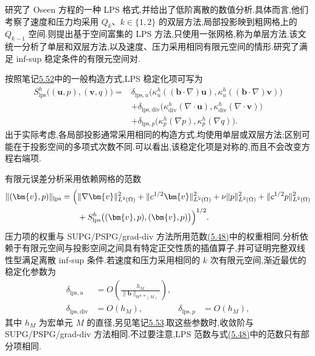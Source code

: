 \begin{note}[LPS 格式]\label{note:oseen-lps-schemes}
\textcite{BraackBurman2006}研究了 Oseen 方程的一种 LPS 格式,并给出了低阶离散的数值分析.具体而言,他们考察了速度和压力均采用 $Q_k$、$k\in\{1,2\}$ 的双层方法,局部投影映到粗网格上的 $Q_{k-1}$ 空间.\textcite{MatthiesSkrzypaczTobiska2007}则提出基于空间富集的 LPS 方法,只使用一张网格,称为单层方法.该文统一分析了单层和双层方法,以及速度、压力采用相同有限元空间的情形.\textcite{LubeRapinLoewe2008,MatthiesTobiska2015}研究了满足 inf-sup 稳定条件的有限元空间对.

按照笔记\hyperref[note:oseen-lps-method]{5.52}中的一般构造方式,LPS 稳定化项可写为
\[
\begin{aligned}
 S_{\mathrm{lps}}^h\bigl((\bm{u},p),(\bm{v},q)\bigr)
  ={}&\delta_{\mathrm{lps},u}
      \bigl(\kappa_u^h((\bm{b}\cdot\nabla)\bm{u}),
            \kappa_u^h((\bm{b}\cdot\nabla)\bm{v})\bigr)\\
   &+\delta_{\mathrm{lps},\mathrm{div}}
      \bigl(\kappa_{\mathrm{div}}^h(\nabla\cdot\bm{u}),
            \kappa_{\mathrm{div}}^h(\nabla\cdot\bm{v})\bigr)\\
   &+\delta_{\mathrm{lps},p}
      \bigl(\kappa_p^h(\nabla p),\kappa_p^h(\nabla q)\bigr).
\end{aligned}
\]
出于实际考虑,各局部投影通常采用相同的构造方式,均使用单层或双层方法;区别可能在于投影空间的多项式次数不同.可以看出,该稳定化项是对称的,而且不会改变方程右端项.

有限元误差分析采用依赖网格的范数
\[
\begin{aligned}
 \|(\bm{v},p)\|_{\mathrm{lps}}
  =\Bigl(&\|\nabla\bm{v}\|_{L^2(\Omega)}^2
       +\|c^{1/2}\bm{v}\|_{L^2(\Omega)}^2
       +\nu\|p\|_{L^2(\Omega)}^2
       +\|c^{1/2}p\|_{L^2(\Omega)}^2\\
       &+S_{\mathrm{lps}}^h\bigl((\bm{v},p),(\bm{v},p)\bigr)
       \Bigr)^{1/2}.
\end{aligned}
\]
压力项的权重与 SUPG/PSPG/grad-div 方法所用范数\hyperref[eq:oseen-spg-pressure-norm]{(5.48)}中的权重相同.分析依赖于有限元空间与投影空间之间具有特定正交性质的插值算子,并可证明完整双线性型满足离散 inf-sup 条件.若速度和压力采用相同的 $k$ 次有限元空间,渐近最优的稳定化参数为
\[
 \begin{aligned}
  \delta_{\mathrm{lps},u}
    &=O\!\left(\frac{h_M}{\|\bm{b}\|_{W^{k,\infty}(M)}}\right),\\
  \delta_{\mathrm{lps},\mathrm{div}}&=O(h_M),
  &\delta_{\mathrm{lps},p}&=O(h_M),
 \end{aligned}
\]
其中 $h_M$ 为宏单元 $M$ 的直径,另见笔记\hyperref[note:oseen-lps-infsup]{5.53}.取这些参数时,收敛阶与 SUPG/PSPG/grad-div 方法相同.不过要注意,LPS 范数与式\hyperref[eq:oseen-spg-pressure-norm]{(5.48)}中的范数只有部分项相同.
\end{note}

